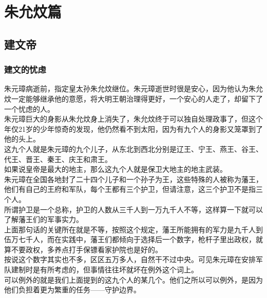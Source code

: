 \fi
\newpage
\setcounter{chapter}{1}
\setcounter{section}{23}
\chapter*{朱允炆篇}
\section{建文帝}
\ifnum{}
	\begin{multicols}{\theparacolNo}
\fi
\subsection{建文的忧虑}
朱元璋病逝前，指定皇太孙朱允炆继位。朱元璋逝世时很是安心，因为他认为朱允炆一定能够继承他的意愿，将大明王朝治理得更好，一个安心的人走了，却留下了一个忧虑的人。\\

朱元璋巨大的身影从朱允炆身上消失了，朱允炆终于可以独自处理政事了，但这个年仅21岁的少年惊奇的发现，他仍然看不到太阳，因为有九个人的身影又笼罩到了他的头上。\\

这九个人就是朱元璋的九个儿子，从东北到西北分别是辽王、宁王、燕王、谷王、代王、晋王、秦王、庆王和肃王。\\

如果说皇帝是最大的地主，那么这九个人就是保卫大地主的地主武装。\\

朱元璋在全国各地封了二十四个儿子和一个孙子为王，这些特殊的人被称为藩王，他们有自己的王府和军队，每个王都有三个护卫，但请注意，这三个护卫不是指三个人。\\

所谓护卫是一个总称，护卫的人数从三千人到一万九千人不等，这样算一下就可以了解藩王们的军事实力。\\

上面那句话的关键所在就是不等，按照这个规定，藩王所能拥有的军力是九千人到伍万七千人，而在实践中，藩王们都倾向于选择后一个数字，枪杆子里出政权，就算不要政权，多养点打手保镖看家护院也是好的。\\

按说这个数字其实也不多，区区五万多人，自然干不过中央。可见朱元璋在安排军队建制时是有所考虑的，但事情往往坏就坏在例外这个词上。\\

可以例外的就是我们上面提到的这九个人的某几个。他们之所以可以例外，是因为他们负担着更为繁重的任务——守护边界。\\


\end{multicols}

